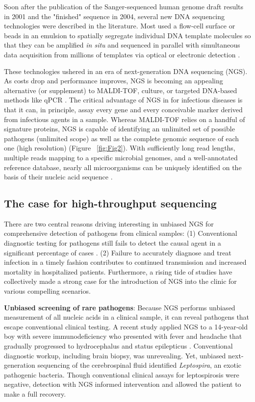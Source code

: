 Soon after the publication of the Sanger-sequenced human genome draft results in 2001 and the "finished" sequence in 2004, several new DNA sequencing technologies were described in the literature. Most used a flow-cell surface or beads in an emulsion to spatially segregate individual DNA template molecules so that they can be amplified \emph{in situ} and sequenced in parallel with simultaneous data acquisition from millions of templates via optical or electronic detection \cite{Boyd:2013cc}.

These technologies ushered in an era of next-generation DNA sequencing (NGS). As costs drop and performance improves, NGS is becoming an appealing alternative (or supplement) to MALDI-TOF, culture, or targeted DNA-based methods like qPCR \cite{Shendure:2012et}. The critical advantage of NGS in for infectious diseases is that it can, in principle, assay every gene and every conceivable marker derived from infectious agents in a sample. Whereas MALDI-TOF relies on a handful of signature proteins, NGS is capable of identifying an unlimited set of possible pathogens (unlimited scope) as well as the complete genomic sequence of each one (high resolution) (Figure ~\ref{fig:Fig2}). With sufficiently long read lengths, multiple reads mapping to a specific microbial genomes, and a well-annotated reference database, nearly all microorganisms can be uniquely identified on the basis of their nucleic acid sequence  \cite{Boyd:2013cc}.

\subsection{The case for high-throughput sequencing}

There are two central reasons driving interesting in unbiased NGS for comprehensive detection of pathogens from clinical samples: (1) Conventional diagnostic testing for pathogens still fails to detect the causal agent in a significant percentage of cases \cite{Naccache:2014gka}. (2) Failure to accurately diagnose and treat infection in a timely fashion contributes to continued transmission and increased mortality in hospitalized patients. Furthermore, a rising tide of studies have collectively made a strong case for the introduction of NGS into the clinic for various compelling scenarios.

\textbf{Unbiased screening of rare pathogens}: Because NGS performs unbiased measurement of all nucleic acids in a clinical sample, it can reveal pathogens that escape conventional clinical testing. A recent study applied NGS to a 14-year-old boy with severe immunodeficiency who presented with fever and headache that gradually progressed to hydrocephalus and status epilepticus \cite{Wilson:2014dv}. Conventional diagnostic workup, including brain biopsy, was unrevealing. Yet, unbiased next-generation sequencing of the cerebrospinal fluid identified \emph{Leptospira}, an exotic pathogenic bacteria. Though conventional clinical assays for leptospirosis were negative, detection with NGS informed intervention and allowed the patient to make a full recovery. 


